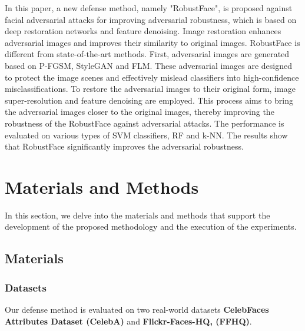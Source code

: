 \documentclass[sn-mathphys]{sn-jnl}%
\theoremstyle{thmstyleone}%
\theoremstyle{thmstyletwo}%
\theoremstyle{thmstylethree}%
\begin{document}
In this paper, a new defense method, namely "RobustFace", is proposed against facial adversarial attacks for improving adversarial robustness, which is based on deep restoration networks and feature denoising. Image restoration enhances adversarial images and improves their similarity to original images. RobustFace is different from state-of-the-art methods. First, adversarial images are generated based on P-FGSM, StyleGAN and FLM. These adversarial images are designed to protect the image scenes and effectively mislead classifiers into high-confidence misclassifications. To restore the adversarial images to their original form, image super-resolution and feature denoising are employed. This process aims to bring the adversarial images closer to the original images, thereby improving the robustness of the RobustFace against adversarial attacks. The performance is evaluated on various types of SVM classifiers, RF and k-NN. The results show that RobustFace significantly improves the adversarial robustness. 

\section{Materials and Methods} 
In this section, we delve into the materials and methods that support the development of the proposed methodology and the execution of the experiments.
\subsection{Materials}
\subsubsection{Datasets}
 Our defense method is evaluated on two real-world datasets \textbf{CelebFaces Attributes Dataset (CelebA)}\cite{liu2015faceattributes} and \textbf{Flickr-Faces-HQ, (FFHQ)}\cite{karras2019style}.
\end{document}
